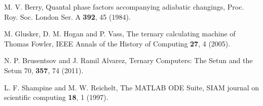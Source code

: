 \documentclass[pra,showpacs,priprent,twocolumn,superscriptaddress]{revtex4-1}
\begin{document}
\begin{thebibliography}{99}
 M. V. Berry, Quantal phase factors accompanying adiabatic changings, Proc. Roy. Soc. London Ser. A \textbf{392}, 45 (1984).

 M. Glusker, D. M. Hogan and P. Vass, The ternary calculating machine of Thomas Fowler, IEEE Annals of the History of Computing \textbf{27}, 4 (2005).

 N. P. Brusentsov and J. Ramil Alvarez, Ternary Computers: The Setun and the Setun 70, \textbf{357}, 74 (2011).


 L. F. Shampine and M. W. Reichelt, The MATLAB ODE Suite, SIAM journal on scientific computing \textbf{18}, 1 (1997).

\end{thebibliography}
\end{document}
